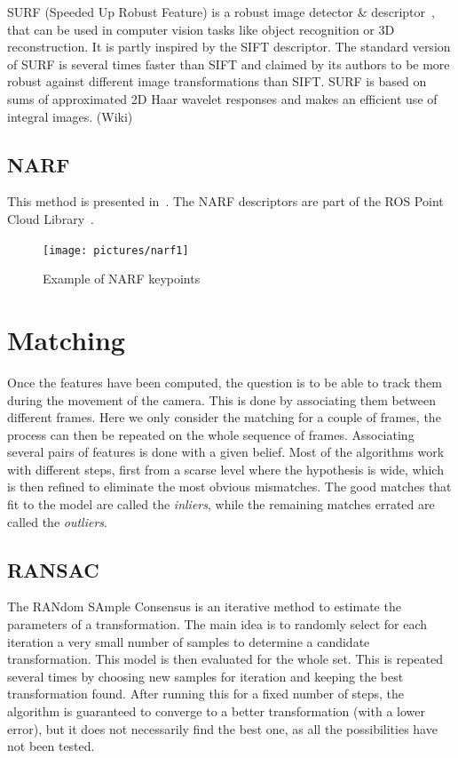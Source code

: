 SURF (Speeded Up Robust Feature) is a robust image detector \& descriptor~\cite{surf}, that can be used in computer vision tasks like object recognition or 3D reconstruction. It is partly inspired by the SIFT descriptor. The standard version of SURF is several times faster than SIFT and claimed by its authors to be more robust against different image transformations than SIFT. SURF is based on sums of approximated 2D Haar wavelet responses and makes an efficient use of integral images. (Wiki)

\subsection{NARF}

This method is presented in~\cite{steder10irosws}. The NARF descriptors are part of the ROS Point Cloud Library~\cite{Rusu_ICRA2011_PCL}.

\begin{figure}[h!]
\centering
\texttt{[image: pictures/narf1]}
\caption{Example of NARF keypoints}
\end{figure}

\section{Matching}

Once the features have been computed, the question is to be able to track them during the movement of the camera. This is done by associating them between different frames. Here we only consider the matching for a couple of frames, the process can then be repeated on the whole sequence of frames. Associating several pairs of features is done with a given belief. Most of the algorithms work with different steps, first from a scarse level where the hypothesis is wide, which is then refined to eliminate the most obvious mismatches. The good matches that fit to the model are called the \emph{inliers}, while the remaining matches errated are called the \emph{outliers}.

\subsection{RANSAC}
\label{sub:ransac}

The RANdom SAmple Consensus is an iterative method to estimate the parameters of a transformation. The main idea is to randomly select for each iteration a very small number of samples to determine a candidate transformation. This model is then evaluated for the whole set. This is repeated several times by choosing new samples for iteration and keeping the best transformation found. After running this for a fixed number of steps, the algorithm is guaranteed to converge to a better transformation (with a lower error), but it does not necessarily find the best one, as all the possibilities have not been tested. 

